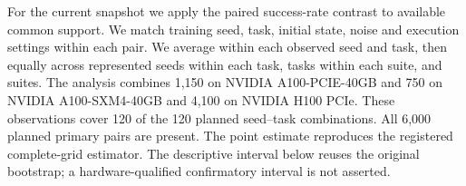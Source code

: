 For the current snapshot we apply the paired success-rate contrast to available common support. We match training seed, task, initial state, noise and execution settings within each pair. We average within each observed seed and task, then equally across represented seeds within each task, tasks within each suite, and suites. The analysis combines 1,150 on NVIDIA A100-PCIE-40GB and 750 on NVIDIA A100-SXM4-40GB and 4,100 on NVIDIA H100 PCIe. These observations cover 120 of the 120 planned seed--task combinations. All 6,000 planned primary pairs are present. The point estimate reproduces the registered complete-grid estimator. The descriptive interval below reuses the original bootstrap; a hardware-qualified confirmatory interval is not asserted.
